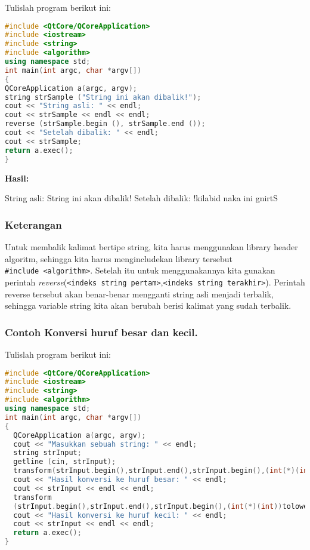 Tulislah program berikut ini:

\begin{lstlisting}[language=c++, caption=Membalik kata / kalimat, label=contoh3-30]
#include <QtCore/QCoreApplication>
#include <iostream>
#include <string>
#include <algorithm>
using namespace std;
int main(int argc, char *argv[])
{
QCoreApplication a(argc, argv);
string strSample ("String ini akan dibalik!");
cout << "String asli: " << endl;
cout << strSample << endl << endl;
reverse (strSample.begin (), strSample.end ());
cout << "Setelah dibalik: " << endl;
cout << strSample;
return a.exec();
}
\end{lstlisting}

\textbf{Hasil:}

\begin{lcverbatim}
String asli:
String ini akan dibalik!
Setelah dibalik:
!kilabid naka ini gnirtS
\end{lcverbatim}

\subsubsection*{Keterangan}

Untuk membalik kalimat bertipe string, kita harus menggunakan library
header algoritm, sehingga kita harus mengincludekan library tersebut
\texttt{\#include\ \textless{}algorithm\textgreater{}}. Setelah itu
untuk menggunakannya kita gunakan perintah
\emph{reverse}(\texttt{\textless{}indeks\ string\ pertam\textgreater{}},\texttt{\textless{}indeks\ string\ terakhir\textgreater{}}).
Perintah reverse tersebut akan benar-benar mengganti string asli menjadi
terbalik, sehingga variable string kita akan berubah berisi kalimat yang
sudah terbalik.

\subsubsection*{Contoh  Konversi huruf besar dan kecil.}

Tulislah program berikut ini:

\begin{lstlisting}[language=c++, caption=Konversi huruf besar dan kecil, label=contoh3-31]
#include <QtCore/QCoreApplication>
#include <iostream>
#include <string>
#include <algorithm>
using namespace std;
int main(int argc, char *argv[])
{
  QCoreApplication a(argc, argv);
  cout << "Masukkan sebuah string: " << endl;
  string strInput;
  getline (cin, strInput);
  transform(strInput.begin(),strInput.end(),strInput.begin(),(int(*)(int))toupper);
  cout << "Hasil konversi ke huruf besar: " << endl;
  cout << strInput << endl << endl;
  transform
  (strInput.begin(),strInput.end(),strInput.begin(),(int(*)(int))tolower);
  cout << "Hasil konversi ke huruf kecil: " << endl;
  cout << strInput << endl << endl;
  return a.exec();
}
\end{lstlisting}

